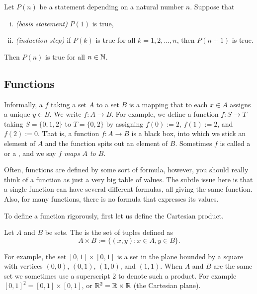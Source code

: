 \begin{thm}
Let $P(n)$ be a statement depending on a natural number $n$.  Suppose that
\begin{enumerate}[(i)]
\item \emph{(basis statement)} $P(1)$ is true,
\item \emph{(induction step)} if $P(k)$ is true for all $k = 1,2,\ldots,n$, then $P(n+1)$ is true.
\end{enumerate}
Then $P(n)$ is true for all $n \in {\mathbb{N}}$.
\end{thm}

\subsection{Functions}

Informally,
a \emph{}
$f$ taking a set $A$ to a set $B$
is a mapping that to each $x \in A$ assigns a unique $y \in B$.  We write
$f \colon A \to B$.  For example, we
define a function $f \colon S \to T$ taking $S = \{ 0, 1, 2 \}$ to $T = \{ 0, 2 \}$
by assigning $f(0) := 2$, $f(1) := 2$, and $f(2) := 0$.  That is, a function $f
\colon A \to B$ is
a black box, into which we stick an element of $A$ and the function
spits out an element of $B$.
Sometimes $f$ is called a \emph{} or a
\emph{},
and we say $f$ \emph{maps $A$ to $B$}.


Often, functions are defined by some sort of
formula, however, you should really think of a function as just a very big
table of values.
The subtle issue here is that a single function can have several different
formulas, all giving the same function.  Also, for many functions, there is
no formula that expresses its values.

To define a function rigorously, first let us define the Cartesian product.

\begin{defn}
Let $A$ and $B$ be sets.  The \emph{}
is the set of tuples defined as
\begin{equation*}
A \times B :=
\{ (x,y) : x \in A, y \in B \} .
\end{equation*}
\end{defn}

For example, the set $[0,1] \times [0,1]$ is a set in the plane
bounded by a square with vertices $(0,0)$, $(0,1)$, $(1,0)$, and $(1,1)$.
When $A$ and $B$ are the same set we sometimes use a superscript 2 to denote
such a product.  For example $[0,1]^2 = 
[0,1] \times [0,1]$, or ${\mathbb{R}}^2 = {\mathbb{R}} \times {\mathbb{R}}$ (the Cartesian plane).

